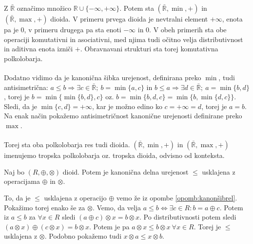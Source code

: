 \documentclass[mat1]{fmfdelo}
\newcommand{\R}{\mathbb{R}}
\begin{document}
\begin{zgled}\label{zgled:tropdioid}
	Z $\bar{\R}$ označimo množico $\R \cup \{-\infty, +\infty\}$. Potem sta $(\bar{\R}, \min, +)$ in $(\bar{\R}, \max, +)$ dioida. V primeru prvega dioida je nevtralni element $+\infty$, enota pa je $0$, v primeru drugega pa sta enoti $-\infty$ in $0$. V obeh primerih sta obe operaciji komutativni in asociativni, med njima tudi očitno velja distributivnost in aditivna enota izniči $+$. Obravnavani strukturi sta torej komutativna polkolobarja.\\
	\\
	 Dodatno vidimo da je kanonična šibka urejenost, definirana preko $\min$, tudi antisimetrična: $a\leq b \Rightarrow \exists c\in \bar{\R};~b = \min\{a, c\}$ in $b\leq a \Rightarrow \exists d\in \bar{\R};~a = \min\{b, d\}$, torej je $b = \min\{\min\{b, d\}, c\}$ oz. $b = \min\{b, d, c\} = \min\{b, \min\{d, c\}\}$. Sledi, da je $\min\{c, d\} = +\infty$, kar je možno edino ko $c = +\infty = d$, torej je $a = b$. Na enak način pokažemo antisimetričnost kanonične urejenosti definirane preko $\max$. \\
	\\
	Torej sta oba polkolobarja res tudi dioida. $(\bar{\R}, \min, +)$ in $(\bar{\R}, \max, +)$ imenujemo tropska polkolobarja oz. tropska dioida, odvisno od konteksta.
\end{zgled}

\begin{trditev}
	Naj bo $(R, \oplus, \otimes)$ dioid. Potem je kanonična delna urejenost $\leq$ usklajena z operacijama $\oplus$ in $\otimes$.
\end{trditev}
\begin{dokaz}
	To, da je $\leq$ usklajena z operacijo $\oplus$ vemo že iz opombe \ref{opomb:kanonšibrel}. Pokažimo torej enako še za $\otimes$.
	Vemo, da velja $a\leq b \iff \exists c\in R: b = a \oplus c$. Potem iz $a \leq b$ za $\forall x\in R$ sledi $(a \oplus c) \otimes x = b \otimes x$.
	Po distributivnosti potem sledi $(a\otimes x) \oplus (c \otimes x) = b\otimes x$. Potem je pa $a\otimes x \leq b\otimes x ~\forall x\in R$. Torej je $\leq$ usklajena z $\otimes$. Podobno pokažemo tudi $x \otimes a \leq x \otimes b$.
\end{dokaz}
\end{document}
